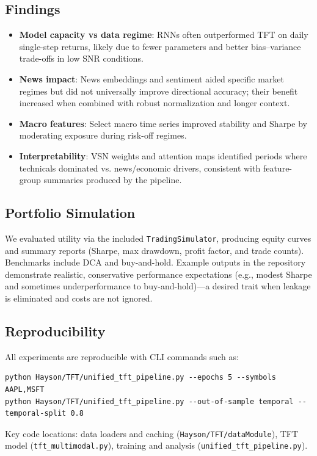 \documentclass[11pt]{article}
\begin{document}
\subsection{Findings}
\begin{itemize}[leftmargin=*]
  \item \textbf{Model capacity vs data regime}: RNNs often outperformed TFT on daily single-step returns, likely due to fewer parameters and better bias--variance trade-offs in low SNR conditions.
  \item \textbf{News impact}: News embeddings and sentiment aided specific market regimes but did not universally improve directional accuracy; their benefit increased when combined with robust normalization and longer context.
  \item \textbf{Macro features}: Select macro time series improved stability and Sharpe by moderating exposure during risk-off regimes.
  \item \textbf{Interpretability}: VSN weights and attention maps identified periods where technicals dominated vs. news/economic drivers, consistent with feature-group summaries produced by the pipeline.
\end{itemize}

\subsection{Portfolio Simulation}
We evaluated utility via the included \texttt{TradingSimulator}, producing equity curves and summary reports (Sharpe, max drawdown, profit factor, and trade counts). Benchmarks include DCA and buy-and-hold. Example outputs in the repository demonstrate realistic, conservative performance expectations (e.g., modest Sharpe and sometimes underperformance to buy-and-hold)—a desired trait when leakage is eliminated and costs are not ignored.

\subsection{Reproducibility}
All experiments are reproducible with CLI commands such as:
\begin{verbatim}
python Hayson/TFT/unified_tft_pipeline.py --epochs 5 --symbols AAPL,MSFT
python Hayson/TFT/unified_tft_pipeline.py --out-of-sample temporal --temporal-split 0.8
\end{verbatim}
Key code locations: data loaders and caching (\texttt{Hayson/TFT/dataModule}), TFT model (\texttt{tft\_multimodal.py}), training and analysis (\texttt{unified\_tft\_pipeline.py}).
\end{document}
